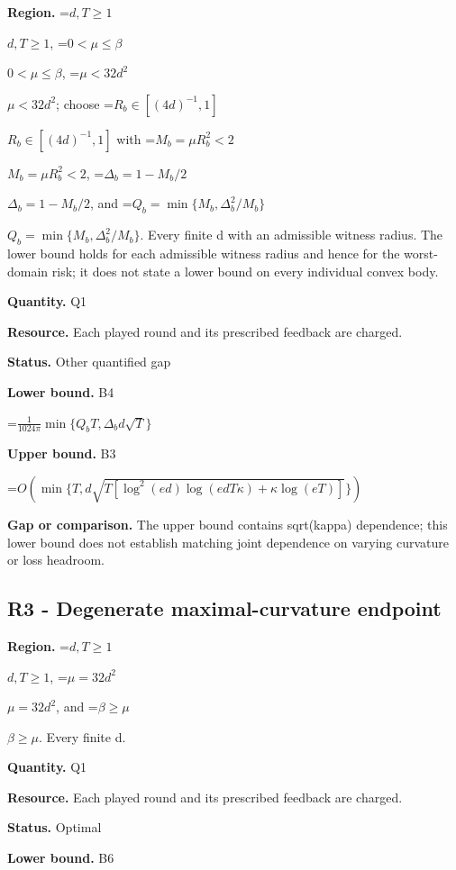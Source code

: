 \documentclass[10pt,a4paper]{article}
\newcommand{\AtlasMath}[1]{\par\begingroup\centering\setbox0=\hbox{$\displaystyle #1$}\ifdim\wd0>1.4\linewidth\typeout{ATLAS WIDE FORMULA: \the\wd0}\fi\ifdim\wd0>\linewidth\resizebox{\linewidth}{!}{\box0}\else\box0\fi\par\endgroup}
\newcommand{\AtlasInlineMath}[1]{\begingroup\setbox0=\hbox{$#1$}\ifdim\wd0>.4\linewidth\endgroup\AtlasMath{#1}\else\endgroup$#1$\fi}
\begin{document}
\textbf{Region.} \AtlasInlineMath{d,T\ge1}, \AtlasInlineMath{0<\mu\le\beta}, \AtlasInlineMath{\mu<32d^2}; choose \AtlasInlineMath{R_b\in[(4d)^{-1},1]} with \AtlasInlineMath{M_b=\mu R_b^2<2}, \AtlasInlineMath{\Delta_b=1-M_b/2}, and \AtlasInlineMath{Q_b=\min\{M_b,\Delta_b^2/M_b\}}. Every finite d with an admissible witness radius. The lower bound holds for each admissible witness radius and hence for the worst-domain risk; it does not state a lower bound on every individual convex body.



\textbf{Quantity.} Q1



\textbf{Resource.} Each played round and its prescribed feedback are charged.



\textbf{Status.} Other quantified gap



\textbf{Lower bound.} B4



\AtlasMath{\frac{1}{1024\pi}\min\{Q_bT,\Delta_bd\sqrt T\}}


\textbf{Upper bound.} B3



\AtlasMath{O\!\left(\min\{T,d\sqrt{T[\log^2(ed)\log(edT\kappa)+\kappa\log(eT)]}\}\right)}


\textbf{Gap or comparison.} The upper bound contains sqrt(kappa) dependence; this lower bound does not establish matching joint dependence on varying curvature or loss headroom.



\subsection{R3 - Degenerate maximal-curvature endpoint}


\textbf{Region.} \AtlasInlineMath{d,T\ge1}, \AtlasInlineMath{\mu=32d^2}, and \AtlasInlineMath{\beta\ge\mu}. Every finite d.



\textbf{Quantity.} Q1



\textbf{Resource.} Each played round and its prescribed feedback are charged.



\textbf{Status.} Optimal



\textbf{Lower bound.} B6
\end{document}

